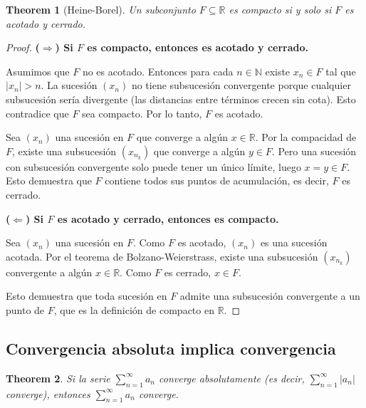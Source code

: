 \documentclass[11pt,a4paper]{article}
\theoremstyle{plain}
\newtheorem{theorem}{Theorem}[section]
\theoremstyle{definition}
\begin{document}
\begin{theorem}[Heine-Borel]
Un subconjunto $F \subseteq \mathbb{R}$ es compacto si y solo si $F$ es acotado y cerrado.
\end{theorem}

\begin{proof}
\textbf{($\Rightarrow$) Si $F$ es compacto, entonces es acotado y cerrado.}

\medskip
Asumimos que $F$ no es acotado. Entonces para cada $n \in \mathbb{N}$ existe $x_n \in F$ tal que $|x_n| > n$. La sucesión $(x_n)$ no tiene subsucesión convergente porque cualquier subsucesión sería divergente (las distancias entre términos crecen sin cota). Esto contradice que $F$ sea compacto. Por lo tanto, $F$ es acotado.

\medskip
Sea $(x_n)$ una sucesión en $F$ que converge a algún $x \in \mathbb{R}$. Por la compacidad de $F$, existe una subsucesión $(x_{n_k})$ que converge a algún $y \in F$. Pero una sucesión con subsucesión convergente solo puede tener un único límite, luego $x = y \in F$. Esto demuestra que $F$ contiene todos sus puntos de acumulación, es decir, $F$ es cerrado.

\medskip
\textbf{($\Leftarrow$) Si $F$ es acotado y cerrado, entonces es compacto.}

\medskip
Sea $(x_n)$ una sucesión en $F$. Como $F$ es acotado, $(x_n)$ es una sucesión acotada. Por el teorema de Bolzano-Weierstrass, existe una subsucesión $(x_{n_k})$ convergente a algún $x \in \mathbb{R}$. Como $F$ es cerrado, $x \in F$.

\medskip
Esto demuestra que toda sucesión en $F$ admite una subsucesión convergente a un punto de $F$, que es la definición de compacto en $\mathbb{R}$.
\end{proof}

\subsection{Convergencia absoluta implica convergencia}

\begin{theorem}
Si la serie $\sum_{n=1}^{\infty} a_n$ converge absolutamente (es decir, $\sum_{n=1}^{\infty} |a_n|$ converge), entonces $\sum_{n=1}^{\infty} a_n$ converge.
\end{theorem}
\end{document}

